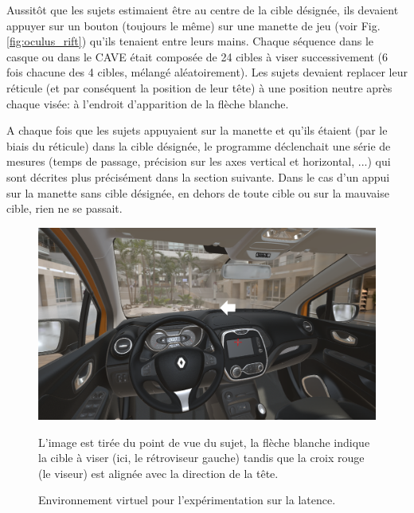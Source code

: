 	\par Aussitôt que les sujets estimaient être au centre de la cible désignée, ils devaient appuyer sur un bouton (toujours le même) sur une manette de jeu (voir Fig. \ref{fig:oculus_rift}) qu'ils tenaient entre leurs mains. Chaque séquence dans le casque ou dans le CAVE était composée de 24 cibles à viser successivement (6 fois chacune des 4 cibles, mélangé aléatoirement). Les sujets devaient replacer leur réticule (et par conséquent la position de leur tête) à une position neutre après chaque visée: à l'endroit d'apparition de la flèche blanche.
	
	\par A chaque fois que les sujets appuyaient sur la manette et qu'ils étaient (par le biais du réticule) dans la cible désignée, le programme déclenchait une série de mesures (temps de passage, précision sur les axes vertical et horizontal, ...) qui sont décrites plus précisément dans la section suivante. Dans le cas d'un appui sur la manette sans cible désignée, en dehors de toute cible ou sur la mauvaise cible, rien ne se passait.
	
	\begin{figure}[h]
		\centering
		\includegraphics[scale=.9]{Figures/ExpeLatency}
		\caption{Environnement virtuel pour l'expérimentation sur la latence.}{L'image est tirée du point de vue du sujet, la flèche blanche indique la cible à viser (ici, le rétroviseur gauche) tandis que la croix rouge (le viseur) est alignée avec la direction de la tête.}
		\label{fig:apparatus_latency}
	\end{figure}
	
